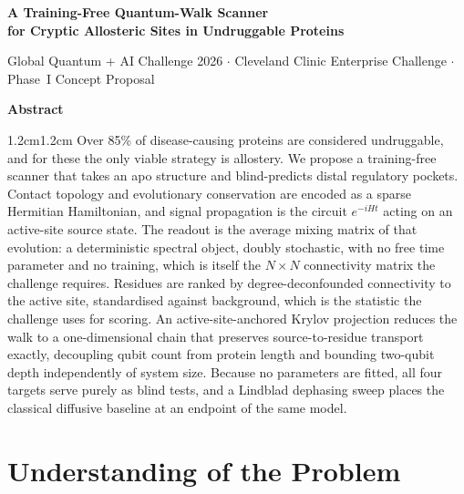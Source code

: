 \documentclass[10pt,a4paper]{article}
\begin{document}
\begin{center}
  {\LARGE\bfseries A Training-Free Quantum-Walk Scanner\\[0.25em]
   for Cryptic Allosteric Sites in Undruggable Proteins\par}
  \vspace{0.9em}
  {\small Global Quantum + AI Challenge 2026 $\cdot$ Cleveland Clinic Enterprise Challenge
   $\cdot$ Phase~I Concept Proposal\par}
\end{center}
\vspace{0.6em}

\begin{center}\textbf{Abstract}\end{center}
\begin{adjustwidth}{1.2cm}{1.2cm}
\small
Over 85\% of disease-causing proteins are considered undruggable, and for these the only viable
strategy is allostery. We propose a training-free scanner that takes an apo structure and
blind-predicts distal regulatory pockets. Contact topology and evolutionary conservation are encoded
as a sparse Hermitian Hamiltonian, and signal propagation is the circuit $e^{-iHt}$ acting on an
active-site source state. The readout is the average mixing matrix of that evolution: a deterministic
spectral object, doubly stochastic, with no free time parameter and no training, which is itself the
$N\times N$ connectivity matrix the challenge requires. Residues are ranked by degree-deconfounded
connectivity to the active site, standardised against background, which is the statistic the
challenge uses for scoring. An active-site-anchored Krylov projection reduces the walk to a
one-dimensional chain that preserves source-to-residue transport exactly, decoupling qubit count from
protein length and bounding two-qubit depth independently of system size. Because no parameters are
fitted, all four targets serve purely as blind tests, and a Lindblad dephasing sweep places the
classical diffusive baseline at an endpoint of the same model.
\end{adjustwidth}
\vspace{0.5em}

\section{Understanding of the Problem}
\end{document}

